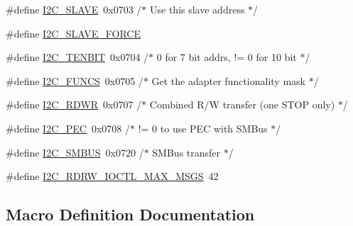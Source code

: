 \begin{DoxyCompactItemize}
\#define \hyperlink{smbus-cffi-0_83_82_2include_2linux_2i2c-dev_8h_ab15137f7c592d05573de99f078516157}{I2\+C\+\_\+\+S\+L\+A\+V\+E}~0x0703	/$\ast$ Use this slave address $\ast$/
\item 
\#define \hyperlink{smbus-cffi-0_83_82_2include_2linux_2i2c-dev_8h_afb1764d4b58fb542306c715ad6a28a42}{I2\+C\+\_\+\+S\+L\+A\+V\+E\+\_\+\+F\+O\+R\+C\+E}
\item 
\#define \hyperlink{smbus-cffi-0_83_82_2include_2linux_2i2c-dev_8h_a2a0b1f3843e98977be7476579c851305}{I2\+C\+\_\+\+T\+E\+N\+B\+I\+T}~0x0704	/$\ast$ 0 for 7 bit addrs, != 0 for 10 bit $\ast$/
\item 
\#define \hyperlink{smbus-cffi-0_83_82_2include_2linux_2i2c-dev_8h_a4c2f02700f22d4f76c670966aed5079a}{I2\+C\+\_\+\+F\+U\+N\+C\+S}~0x0705	/$\ast$ Get the adapter functionality mask $\ast$/
\item 
\#define \hyperlink{smbus-cffi-0_83_82_2include_2linux_2i2c-dev_8h_a7645f9831bcbbae2339fcff4d85691be}{I2\+C\+\_\+\+R\+D\+W\+R}~0x0707	/$\ast$ Combined R/\+W transfer (one S\+T\+O\+P only) $\ast$/
\item 
\#define \hyperlink{smbus-cffi-0_83_82_2include_2linux_2i2c-dev_8h_a2a72d7072db21c407f82e6e73854b38f}{I2\+C\+\_\+\+P\+E\+C}~0x0708	/$\ast$ != 0 to use P\+E\+C with S\+M\+Bus $\ast$/
\item 
\#define \hyperlink{smbus-cffi-0_83_82_2include_2linux_2i2c-dev_8h_a4e9d483fb9eb1074646726ce518b1d4d}{I2\+C\+\_\+\+S\+M\+B\+U\+S}~0x0720	/$\ast$ S\+M\+Bus transfer $\ast$/
\item 
\#define \hyperlink{smbus-cffi-0_83_82_2include_2linux_2i2c-dev_8h_a272399a0175400a2ebb55ff518a85012}{I2\+C\+\_\+\+R\+D\+R\+W\+\_\+\+I\+O\+C\+T\+L\+\_\+\+M\+A\+X\+\_\+\+M\+S\+G\+S}~42
\end{DoxyCompactItemize}


\subsection{Macro Definition Documentation}
\hypertarget{smbus-cffi-0_83_82_2include_2linux_2i2c-dev_8h_a41ba50f5508feed338fe3181540e1894}{}

